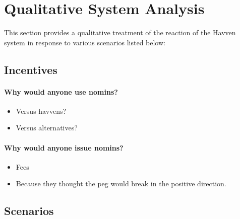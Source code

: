 
\section{Qualitative System Analysis}

This section provides a qualitative treatment of the reaction of the Havven system in response to various scenarios listed below:


\subsection{Incentives}

\paragraph{Why would anyone use nomins?}
\begin{itemize}
	\item Versus havvens?
	\item Versus alternatives?
\end{itemize}

\paragraph{Why would anyone issue nomins?}
\begin{itemize}
	\item Fees
	\item Because they thought the peg would break in the positive direction.
\end{itemize}

\subsection{Scenarios}

